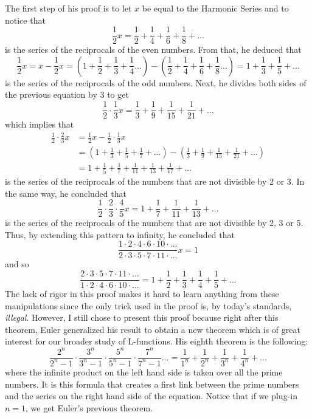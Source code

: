 The first step of his proof is to let $x$ be equal to the Harmonic Series and to notice that 
$$\frac{1}{2}x = \frac{1}{2} + \frac{1}{4} + \frac{1}{6} + \frac{1}{8} + \dots$$
is the series of the reciprocals of the even numbers. From that, he deduced that
$$\frac{1}{2}x = x - \frac{1}{2}x = \left(1 + \frac{1}{2} + \frac{1}{3} + \frac{1}{4} \dots\right) - \left(\frac{1}{2} + \frac{1}{4} + \frac{1}{6} + \frac{1}{8} \dots\right) = 1 + \frac{1}{3} + \frac{1}{5} + \dots$$
is the series of the reciprocals of the odd numbers. Next, he divides both sides of the previous equation by 3 to get
$$\frac{1}{2}\cdot\frac{1}{3}x = \frac{1}{3} + \frac{1}{9} + \frac{1}{15} + \frac{1}{21} + \dots$$
which implies that
\begin{align*}
    \frac{1}{2}\cdot \frac{2}{3}x &= \frac{1}{2}x - \frac{1}{2}\cdot\frac{1}{3}x \\
    &= \left(1 + \frac{1}{3} + \frac{1}{5} + \frac{1}{7} + \dots \right) - \left(\frac{1}{3} + \frac{1}{9} + \frac{1}{15} + \frac{1}{21} + \dots \right) \\
    &= 1 + \frac{1}{5} + \frac{1}{7} + \frac{1}{11} + \frac{1}{13} + \frac{1}{17} + \dots
\end{align*}
is the series of the reciprocals of the numbers that are not divisible by 2 or 3. In the same way, he concluded that
$$\frac{1}{2}\cdot \frac{2}{3}\cdot \frac{4}{5}x = 1 + \frac{1}{7} + \frac{1}{11} + \frac{1}{13} + \dots$$
is the series of the reciprocals of the numbers that are not divisible by 2, 3 or 5. Thus, by extending this pattern to infinity, he concluded that
$$\frac{1\cdot 2 \cdot 4 \cdot 6 \cdot 10 \cdot \dots}{2\cdot 3 \cdot 5 \cdot 7 \cdot 11 \cdot \dots}x = 1$$
and so
$$\frac{2\cdot 3 \cdot 5 \cdot 7 \cdot 11 \cdot \dots}{1\cdot 2 \cdot 4 \cdot 6 \cdot 10 \cdot \dots} = 1 + \frac{1}{2} + \frac{1}{3} + \frac{1}{4} + \frac{1}{5} + \dots$$
The lack of rigor in this proof makes it hard to learn anything from these manipulations since the only trick used in the proof is, by today's standards, \textit{illegal}. However, I still chose to present this proof because right after this theorem, Euler generalized his result to obtain a new theorem which is of great interest for our broader study of L-functions. His eighth theorem is the following:
\begin{equation} \label{Euler Product}
    \boxed{\frac{2^n}{2^n - 1}\cdot\frac{3^n}{3^n - 1} \cdot \frac{5^n}{5^n - 1} \cdot \frac{7^n}{7^n - 1} \dots = \frac{1}{1^n} + \frac{1}{2^n} + \frac{1}{3^n} + \frac{1}{4^n} + \dots}
\end{equation}
where the infinite product on the left hand side is taken over all the prime numbers. It is this formula that creates a first link between the prime numbers and the series on the right hand side of the equation. Notice that if we plug-in $n = 1$, we get Euler's previous theorem.


